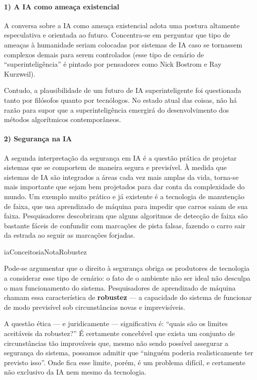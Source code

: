 \documentclass[
  11pt,
]{article}
\newenvironment{tecnica}[1][Nota tecnica]{\begin{iabox}{iaConceitos}{iaNota}{#1}}{\end{iabox}}
\begin{document}
\paragraph{1) A IA como ameaça
existencial}\label{a-ia-como-ameauxe7a-existencial}

A conversa sobre a IA como ameaça existencial adota uma postura
altamente especulativa e orientada ao futuro. Concentra-se em perguntar
que tipo de ameaças à humanidade seriam colocadas por sistemas de IA
caso se tornassem complexos demais para serem controlados (esse tipo de
cenário de ``superinteligência'' é pintado por pensadores como Nick
Bostrom e Ray Kurzweil).

Contudo, a plausibilidade de um futuro de IA superinteligente foi
questionada tanto por filósofos quanto por tecnólogos. No estado atual
das coisas, não há razão para supor que a superinteligência emergirá do
desenvolvimento dos métodos algorítmicos contemporâneos.

\paragraph{2) Segurança na IA}\label{seguranuxe7a-na-ia}

A segunda interpretação da segurança em IA é a questão prática de
projetar sistemas que se comportem de maneira segura e previsível. À
medida que sistemas de IA são integrados a áreas cada vez mais amplas da
vida, torna-se mais importante que sejam bem projetados para dar conta
da complexidade do mundo. Um exemplo muito prático e já existente é a
tecnologia de manutenção de faixa, que usa aprendizado de máquina para
impedir que carros saiam de sua faixa. Pesquisadores descobriram que
alguns algoritmos de detecção de faixa são bastante fáceis de confundir
com marcações de pista falsas, fazendo o carro sair da estrada ao seguir
as marcações forjadas.

\begin{tecnica}[Robustez]

Pode-se argumentar que o direito à segurança obriga os produtores de
tecnologia a considerar esse tipo de cenário: o fato de o ambiente não
ser ideal não desculpa o mau funcionamento do sistema. Pesquisadores de
aprendizado de máquina chamam essa característica de \textbf{robustez}
--- a capacidade do sistema de funcionar de modo previsível sob
circunstâncias novas e imprevisíveis.

\end{tecnica}

A questão ética --- e juridicamente --- significativa é: ``quais são os
limites aceitáveis da robustez?'' É certamente concebível que exista um
conjunto de circunstâncias tão improváveis que, mesmo não sendo possível
assegurar a segurança do sistema, possamos admitir que ``ninguém poderia
realisticamente ter previsto isso''. Onde fica esse limite, porém, é um
problema difícil, e certamente não exclusivo da IA nem mesmo da
tecnologia.
\end{document}
